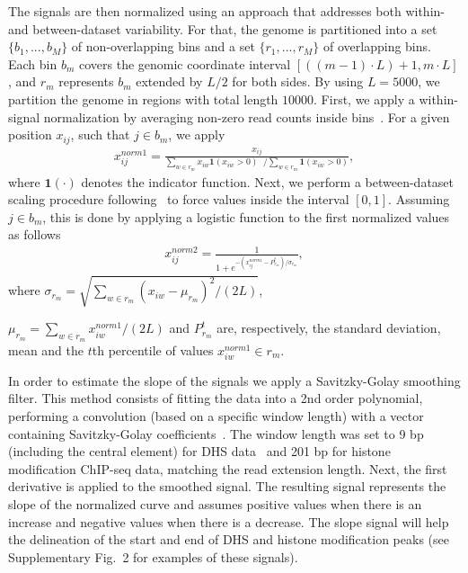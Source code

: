 \documentclass{bioinfo}
\begin{document}
\begin{methods}
The signals are then normalized using an approach that addresses both
within- and between-dataset variability. For that, the genome is
partitioned into a set $\{b_1,...,b_M\} $ of non-overlapping bins
and a set $\{r_1,...,r_M\} $ of overlapping bins.
Each bin $b_m$ covers the genomic coordinate interval $[((m-1) \cdot L )+1,m \cdot L]$,
and $r_m$ represents $b_m$ extended by $L/2$ for both sides. 
By using $L=5000$, we partition the genome in regions with total
length $10000$. First, we apply a within-signal
normalization by averaging non-zero read counts inside bins~\citep{boyle2011}.
For a given position $x_{ij}$, such that $j \in b_m$, we apply
\begin{align}
    x^{{norm1}}_{ij} = \frac{x_{ij}}{ 
                        \sum\limits_{w \in {r_m}} x_{iw} \mathbf{1}({x}_{iw}>0)  \;\; \Big/  
                        \sum\limits_{w \in {r_m}} \mathbf{1}(x_{iw}>0)
                        },
    \label{eq:norm1}
\end{align}
where $ {\mathbf{1}}(\cdot) $ denotes the indicator
function. Next, we perform a between-dataset scaling procedure
following~\citep{hon2009} to force values inside the interval $ [0,1] $.
Assuming $j \in b_m$, this is done by applying a logistic function
to the first normalized values as follows
\begin{align}
    {x}^{{norm2}}_{ij} = \frac{1}{1+e^{{-(x^{{norm1}}_{ij}-P^{t}_{r_m})}/{\sigma}_{{r_m}}}},
    \label{eq:norm2}
\end{align}
where $\sigma_{r_m} = \sqrt{ \sum_{w \in r_m} (x_{iw} - \mu_{r_m})^2/(2L) }$,

\noindent
$\mu_{r_m}=  \sum_{w \in r_m}  x^{norm1}_{iw}/(2L)$  and $P^{t}_{r_m}$ are, respectively, the standard deviation, mean and the $t$th percentile of values $x^{norm1}_{iw} \in r_m$.

In order to estimate the slope of the signals we apply a Savitzky-Golay
smoothing filter. This method consists of fitting the data into
a 2nd order polynomial, performing a convolution (based on a specific
window length) with a vector containing Savitzky-Golay
coefficients~\citep{madden1978}. The window length was set to 9 bp
(including the central element) for DHS data~\citep{boyle2011}
and 201 bp for histone modification ChIP-seq data, matching the read
extension length. Next, the first derivative is applied to the
smoothed signal. The resulting signal represents the slope of the
normalized curve and assumes positive values when there is an increase
and negative values when there is a decrease. The slope signal will
help the delineation of the start and end of DHS and histone
modification peaks (see Supplementary Fig.~2 for examples of these signals).


\end{methods}
\end{document}
